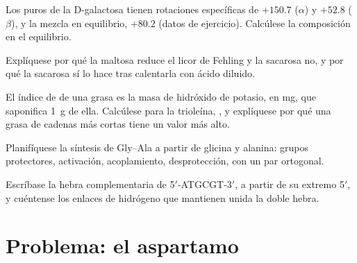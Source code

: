\begin{exercise}[$\star\star$]\label{exo:b2:biomolecules:8}
Los  puros de la D-galactosa tienen rotaciones específicas de $+150.7$ ($\alpha$) y $+52.8$ ($\beta$), y
la mezcla en equilibrio, $+80.2$ (datos de ejercicio). Calcúlese la composición en el equilibrio.
\end{exercise}

\begin{exercise}[$\star\star$]\label{exo:b2:biomolecules:9}
Explíquese por qué la maltosa reduce el licor de Fehling y la sacarosa no, y por qué la sacarosa sí lo hace tras
calentarla con ácido diluido.
\end{exercise}

\begin{exercise}[$\star\star\star$]\label{exo:b2:biomolecules:10}
El índice de  de una grasa es la masa de hidróxido de potasio, en mg, que saponifica 1~g de ella.
Calcúlese para la trioleína, , y explíquese por qué una grasa de cadenas más cortas tiene un valor más alto.
\end{exercise}

\begin{exercise}[$\star\star\star$]\label{exo:b2:biomolecules:11}
Planifíquese la síntesis de Gly--Ala a partir de glicina y alanina: grupos protectores, activación, acoplamiento,
desprotección, con un par ortogonal.
\end{exercise}

\begin{exercise}[$\star\star\star$]\label{exo:b2:biomolecules:12}
Escríbase la hebra complementaria de 5$'$-ATGCGT-3$'$, a partir de su extremo 5$'$, y cuéntense los enlaces de hidrógeno
que mantienen unida la doble hebra.
\end{exercise}

\section{Problema: el aspartamo}

